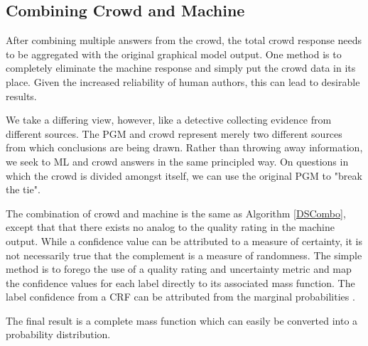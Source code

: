 \subsection{Combining Crowd and Machine}

After combining multiple answers from the crowd, the total crowd response needs to be aggregated with the original graphical model output.  One method is to completely eliminate the machine response and simply put the crowd data in its place.  Given the increased reliability of human authors, this can lead to desirable results.

We take a differing view, however, like a detective collecting evidence from different sources.  The PGM and crowd represent merely two different sources from which conclusions are being drawn.  Rather than throwing away information, we seek to ML and crowd answers in the same principled way.  On questions in which the crowd is divided amongst itself, we can use the original PGM to "break the tie".

The combination of crowd and machine is the same as Algorithm \ref{DSCombo}, except that that there exists no analog to the quality rating in the machine output.  While a confidence value can be attributed to a measure of certainty, it is not necessarily true that the complement is a measure of randomness.  The simple method is to forego the use of a quality rating and uncertainty metric and map the confidence values for each label directly to its associated mass function.  The label confidence from a CRF can be attributed from the marginal probabilities \cite{Kristjansson:2004:IIE:1597148.1597216}. 

The final result is a complete mass function which can easily be converted into a probability distribution.
